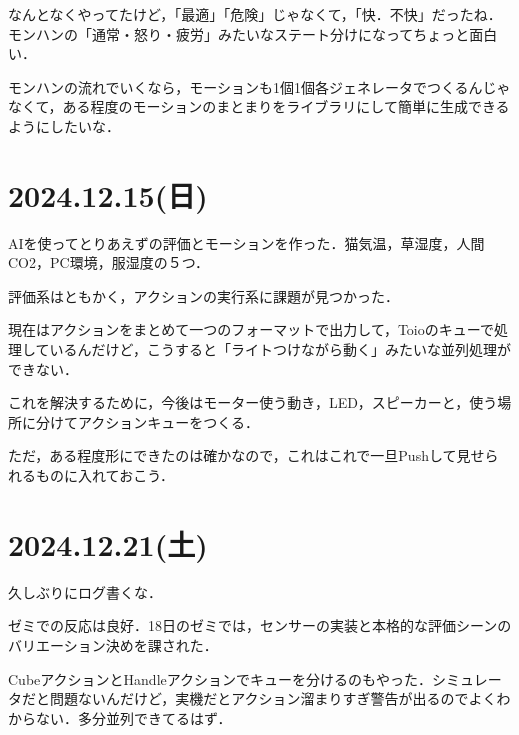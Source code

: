 \documentclass[fleqn,twocolumn]{mynote}
\begin{document}
  なんとなくやってたけど，「最適」「危険」じゃなくて，「快．不快」だったね．モンハンの「通常・怒り・疲労」みたいなステート分けになってちょっと面白い．

  モンハンの流れでいくなら，モーションも1個1個各ジェネレータでつくるんじゃなくて，ある程度のモーションのまとまりをライブラリにして簡単に生成できるようにしたいな．

  \fboxsep=0pt            %
  \fboxrule=1pt            %
  \begin{figure}[h]
    \centering
    \caption{}
    \label{fig:}
  \end{figure}

  \section*{2024.12.15(日)}
  AIを使ってとりあえずの評価とモーションを作った．猫気温，草湿度，人間CO2，PC環境，服湿度の５つ．

  評価系はともかく，アクションの実行系に課題が見つかった．

  現在はアクションをまとめて一つのフォーマットで出力して，Toioのキューで処理しているんだけど，こうすると「ライトつけながら動く」みたいな並列処理ができない．

  これを解決するために，今後はモーター使う動き，LED，スピーカーと，使う場所に分けてアクションキューをつくる．

  ただ，ある程度形にできたのは確かなので，これはこれで一旦Pushして見せられるものに入れておこう．

  \section*{2024.12.21(土)}
  久しぶりにログ書くな．

  ゼミでの反応は良好．18日のゼミでは，センサーの実装と本格的な評価シーンのバリエーション決めを課された．

  CubeアクションとHandleアクションでキューを分けるのもやった．シミュレータだと問題ないんだけど，実機だとアクション溜まりすぎ警告が出るのでよくわからない．多分並列できてるはず．
\end{document}
